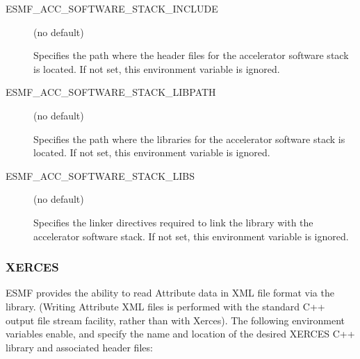 \begin{description}
\begin{description}
\end{description}

\item[ESMF\_ACC\_SOFTWARE\_STACK\_INCLUDE] (no default)

Specifies the path where the header files for the accelerator software
stack is located. If not set, this environment variable is ignored.

\item[ESMF\_ACC\_SOFTWARE\_STACK\_LIBPATH] (no default)

Specifies the path where the libraries for the accelerator software
stack is located. If not set, this environment variable is ignored.

\item[ESMF\_ACC\_SOFTWARE\_STACK\_LIBS] (no default)

Specifies the linker directives required to link the library with
the accelerator software stack. If not set, this environment variable 
is ignored.

\end{description}


\subsubsection{XERCES}
\label{sec:xerces}
ESMF provides the ability to read Attribute data in XML file format 
via the  
library.  (Writing Attribute XML files is performed with the standard C++ 
output file stream facility, rather than with Xerces).  The following 
environment variables enable, and specify the name and location of the 
desired XERCES C++ library and associated header files:


